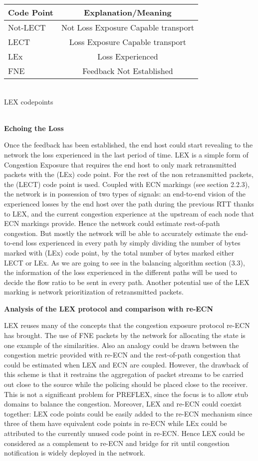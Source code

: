 \begin{center}
\begin{tabular}{| l | c| } \hline
Code Point & Explanation/Meaning \\ \hline
Not-LECT & Not Loss Exposure Capable transport \\
LECT & Loss Exposure Capable transport \\
LEx & Loss Experienced \\
FNE & Feedback Not Established \\
\hline
\end{tabular}
\\LEX codepoints
\end{center}
\\
{\bf Echoing the Loss}

Once the feedback has been established, the end host could start revealing to the network the loss experienced in the last period of time. LEX is a simple form of Congestion Exposure that requires the end host to only mark retransmitted packets with the (LEx) code point. For the rest of the non retransmitted packets, the (LECT) code point is used. Coupled with ECN markings (see section 2.2.3), the network is in possession of two types of signals: an end-to-end vision of the experienced losses by the end host over the path during the previous RTT thanks to LEX, and the  current congestion experience at the upstream of each node that ECN markings provide. Hence the network could estimate rest-of-path congestion. But mostly the network will be able to accurately estimate the end-to-end loss experienced in every path by simply dividing the number of bytes marked with (LEx) code point,  by the total number of bytes marked either LECT or LEx. As we are going to see in the balancing algorithm section (3.3), the information of the loss experienced in the different paths will be used to decide the flow ratio to be sent in every path. Another potential use of the LEX marking is network prioritization of retransmitted packets.

{\bf Analysis of the LEX protocol and comparison with re-ECN}

LEX reuses many of the concepts that the congestion exposure protocol re-ECN has brought. The use of FNE packets by the network for allocating the state is one example of the similarities. Also an analogy could be drawn between the congestion metric provided with re-ECN and the rest-of-path congestion that could be estimated when LEX and ECN are coupled. However, the drawback of this scheme is that it restrains the aggregation of  packet streams to be carried out close to the source while the policing should be placed close to the receiver. This is not a significant problem for PREFLEX, since the focus  is to allow stub domains to balance the congestion. Moreover, LEX and re-ECN could coexist together: LEX code points could be easily added to the re-ECN mechanism since three of them have equivalent code points in re-ECN while LEx could be attributed to the currently unused code point in re-ECN. Hence LEX could be considered as a complement to re-ECN and bridge for rit until congestion notification is widely deployed in the network.

